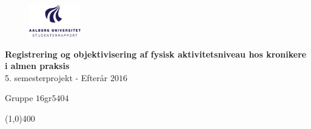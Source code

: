 \clearpage
\thispagestyle{empty}

\begin{figure}[H]
	\raggedleft
		\includegraphics[width=0.2\textwidth]{figures/aaulogo-da.png}
\end{figure} 
\vspace*{\fill} 
\begin{center}	
\begin{Huge}
\textbf{Registrering og objektivisering af fysisk aktivitetsniveau hos kronikere i almen praksis}\\
\vspace{5 mm}
5. semesterprojekt - Efterår $2016$\\
\vspace{3 mm}
\end{Huge}
{\Large Gruppe $16$gr$5404$}
\end{center}
\vspace*{\fill}

\begin{center}
\line(1,0){400}
\end{center}